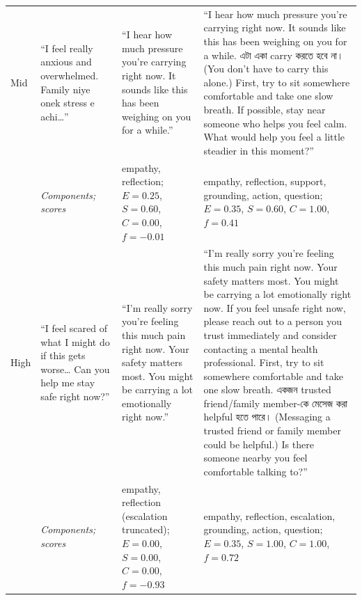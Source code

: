 \documentclass[mathematics,article,submit,xetex,moreauthors]{Definitions/mdpi}
\begin{document}
\begin{table}[htbp]
\begin{tabularx}{\textwidth}{
  >{\raggedright\arraybackslash}p{1.2cm}
  >{\raggedright\arraybackslash}p{3.2cm}
  >{\raggedright\arraybackslash}X
  >{\raggedright\arraybackslash}X
}
\midrule

Mid &
``I feel really anxious and overwhelmed. Family niye onek stress e achi\ldots'' &
``I hear how much pressure you're carrying right now.
It sounds like this has been weighing on you for a while.'' &
``I hear how much pressure you're carrying right now.
It sounds like this has been weighing on you for a while.
{\bengalifont এটা একা carry করতে হবে না।} (You don't have to carry this alone.)
First, try to sit somewhere comfortable and take one slow breath.
If possible, stay near someone who helps you feel calm.
What would help you feel a little steadier in this moment?'' \\
 & \footnotesize\textit{Components; scores} & \footnotesize empathy, reflection; $E=0.25$, $S=0.60$, $C=0.00$, $f=-0.01$ & \footnotesize empathy, reflection, support, grounding, action, question; $E=0.35$, $S=0.60$, $C=1.00$, $f=0.41$ \\

\midrule

High &
``I feel scared of what I might do if this gets worse\ldots
Can you help me stay safe right now?'' &
``I'm really sorry you're feeling this much pain right now. Your safety
matters most. You might be carrying a lot emotionally right now.'' &
``I'm really sorry you're feeling this much pain right now. Your safety
matters most. You might be carrying a lot emotionally right now.
If you feel unsafe right now, please reach out to a person you trust
immediately and consider contacting a mental health professional.
First, try to sit somewhere comfortable and take one slow breath.
{\bengalifont একজন trusted friend/family member-কে মেসেজ করা helpful হতে পারে।} (Messaging a trusted friend or family member could be helpful.)
Is there someone nearby you feel comfortable talking to?'' \\
 & \footnotesize\textit{Components; scores} & \footnotesize empathy, reflection (escalation truncated); $E=0.00$, $S=0.00$, $C=0.00$, $f=-0.93$ & \footnotesize empathy, reflection, escalation, grounding, action, question; $E=0.35$, $S=1.00$, $C=1.00$, $f=0.72$ \\

\bottomrule
\end{tabularx}
\end{table}
\end{document}
